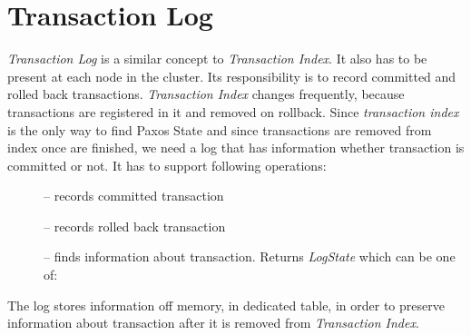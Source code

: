 
\section{Transaction Log}
\label{sec:mpp:transactionLog}
\emph{Transaction Log} is a similar concept to \emph{Transaction Index}. It also has to be present at each node in the cluster. Its responsibility is to record committed and rolled back transactions. \emph{Transaction Index} changes frequently, because transactions are registered in it and removed on rollback. Since \emph{transaction index} is the only way to find Paxos State and since transactions are removed from index once are finished, we need a log that has information whether transaction is committed or not. It has to support following operations:
\begin{description}
\item[] -- records committed transaction
\item[] -- records rolled back transaction
\item[] -- finds information about transaction. Returns \emph{LogState} which can be one of:  
\end{description}
The log stores information off memory, in dedicated table, in order to preserve information about transaction after it is removed from \emph{Transaction Index}.